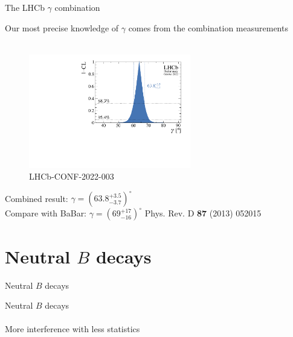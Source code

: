 \documentclass[dvipsnames]{beamer}
\begin{document}
\begin{frame}{The LHCb $\gamma$ combination}
  \begin{center}
    {\Large Our most precise knowledge of $\gamma$ comes from the combination measurements}\\~\\
  \end{center}
  \vspace{-0.5cm}
  \begin{figure}
    \includegraphics[height=5.0cm]{Plots/gammacharm_lhcb_gamma_only.pdf}
    \vspace{-0.5cm}
    \caption*{\tiny LHCb-CONF-2022-003}
  \end{figure}
  \vspace{-0.62cm}
  \begin{center}
    Combined result: \colorbox{Cerulean!30}{$\gamma = (63.8^{+3.5}_{-3.7})^\circ$}\\
    Compare with BaBar: $\gamma = (69^{+17}_{-16})^\circ$ Phys. Rev. D \textbf{87} (2013) 052015
  \end{center}
  \vspace{-0.15cm}
\end{frame}

\section{Neutral \texorpdfstring{$B$}{B} decays}
\begin{frame}{Neutral $B$ decays}
  \begin{center}
    {\huge Neutral $B$ decays} \\~\\
    {\large More interference with less statistics}
  \end{center}
\end{frame}
\end{document}
